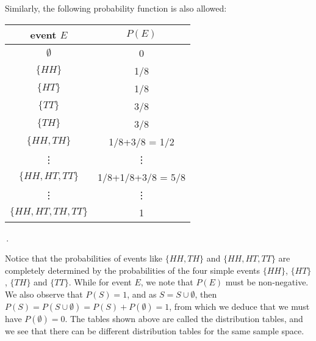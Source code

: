 \documentclass[11pt,oneside]{book}
\theoremstyle{newStyle}
\begin{document}
Similarly, the following probability function is also allowed:
\begin{center}
\begin{tabular}{|c|c|}
\hline \rowcolor{lightgray}
\textbf{event $E$} & $P(E)$\\
\hline
$\emptyset$ & 0 \\
\hline
$\{HH\}$ & 1/8\\
\hline
$\{HT\}$ & 1/8\\
\hline
$\{TT\}$ & 3/8\\
\hline
$\{TH\}$ & 3/8\\
\hline
$\{HH, TH\}$ & 1/8+3/8 = 1/2\\
\hline
\vdots & \vdots \\
\hline
$\{HH, HT, TT\}$ & 1/8+1/8+3/8 = 5/8\\
\hline 
\vdots & \vdots \\
\hline
$\{HH, HT, TH, TT\}$ & 1\\
\hline
\end{tabular}\,.
\end{center}
Notice that the probabilities of events like $\{HH, TH\}$ and $\{HH, HT, TT\}$ are completely determined by the probabilities of the four simple events $\{HH\}$, $\{HT\}$, $\{TH\}$ and $\{TT\}$. While for event $E$, we note that $P(E)$ must be non-negative. We also observe that $P(S) = 1$, and as $S = S\cup \emptyset$, then $P(S) = P(S\cup \emptyset) = P(S) + P(\emptyset) = 1$, from which we deduce that we must have $P(\emptyset) = 0$. The tables shown above are called the distribution tables, and we see that there can be different distribution tables for the same sample space. \\


\newpage
\end{document}

